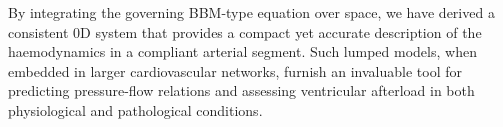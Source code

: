 \documentclass[alpha-refs, 12pt]{wiley-article}
\begin{document}
By integrating the governing BBM-type equation over space, we have derived a consistent 0D system that provides a compact yet accurate description of the haemodynamics in a compliant arterial segment. Such lumped models, when embedded in larger cardiovascular networks, furnish an invaluable tool for predicting pressure-flow relations and assessing ventricular afterload in both physiological and pathological conditions.
\end{document}
